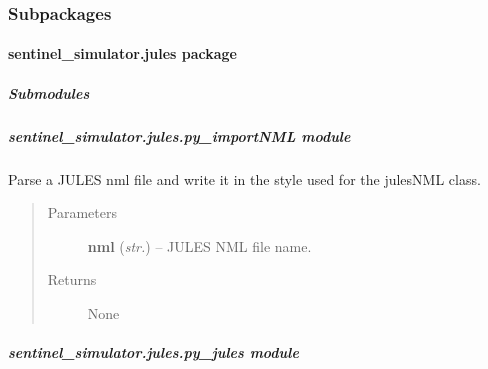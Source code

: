 \documentclass[letterpaper,10pt,english]{sphinxmanual}
\begin{document}
\subsubsection{Subpackages}
\label{source/sentinel_simulator:subpackages}

\paragraph{sentinel\_simulator.jules package}
\label{source/sentinel_simulator.jules:sentinel-simulator-jules-package}\label{source/sentinel_simulator.jules::doc}

\subparagraph{Submodules}
\label{source/sentinel_simulator.jules:submodules}

\subparagraph{sentinel\_simulator.jules.py\_importNML module}
\label{source/sentinel_simulator.jules:module-sentinel_simulator.jules.py_importNML}\label{source/sentinel_simulator.jules:sentinel-simulator-jules-py-importnml-module}

\begin{fulllineitems}
\label{source/sentinel_simulator.jules:sentinel_simulator.jules.py_importNML.importJulesNML}
Parse a JULES nml file and write it in the style used for the
julesNML class.
\begin{quote}\begin{description}
\item[{Parameters}] \leavevmode
\textbf{nml} (\emph{str.}) -- JULES NML file name.

\item[{Returns}] \leavevmode
None

\end{description}\end{quote}

\end{fulllineitems}



\subparagraph{sentinel\_simulator.jules.py\_jules module}
\label{source/sentinel_simulator.jules:module-sentinel_simulator.jules.py_jules}\label{source/sentinel_simulator.jules:sentinel-simulator-jules-py-jules-module}
\end{document}
